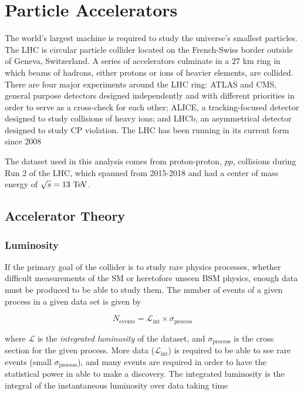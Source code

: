 \chapter{Particle Accelerators}

The world's largest machine is required to study the universe's smallest particles. The \ac{LHC} is circular particle collider located on the French-Swiss border outside of Geneva, Switzerland. A series of accelerators culminate in a $27$ km ring in which beams of hadrons, either protons or ions of heavier elements, are collided. There are four major experiments around the \ac{LHC} ring: \ac{ATLAS} and \ac{CMS}, general purpose detectors designed independently and with different priorities in order to serve as a cross-check for each other; \ac{ALICE}, a tracking-focused detector designed to study collisions of heavy ions; and \ac{LHCb}, an asymmetrical detector designed to study \ac{CP} violation. The \ac{LHC} has been running in its current form since 2008

The dataset used in this analysis comes from proton-proton, $pp$, collisions during Run 2 of the \ac{LHC}, which spanned from 2015-2018 and had a center of mass energy of $\sqrt{s} = 13 \TeV$.

\section{Accelerator Theory}


\subsection{Luminosity}

If the primary goal of the collider is to study rare physics processes, whether difficult measurements of the \ac{SM} or heretofore unseen \ac{BSM} physics, enough data must be produced to be able to study them. The number of events of a given process in a given data set is given by

\begin{equation}
N_{\textrm{events}} = \mathcal{L}_{\textrm{int}} \times \sigma_{\textrm{process}}
\label{eq:nevents_lumi}
\end{equation}

where $\mathcal{L}$ is the \emph{integrated luminosity} of the dataset, and $\sigma_{\textrm{process}}$ is the cross section for the given process. More data ($\mathcal{L}_{\textrm{int}}$) is required to be able to see rare events (small $\sigma_{\textrm{process}}$), and many events are required in order to have the statistical power in able to make a discovery. The integrated luminosity is the integral of the instantaneous luminosity over data taking time

